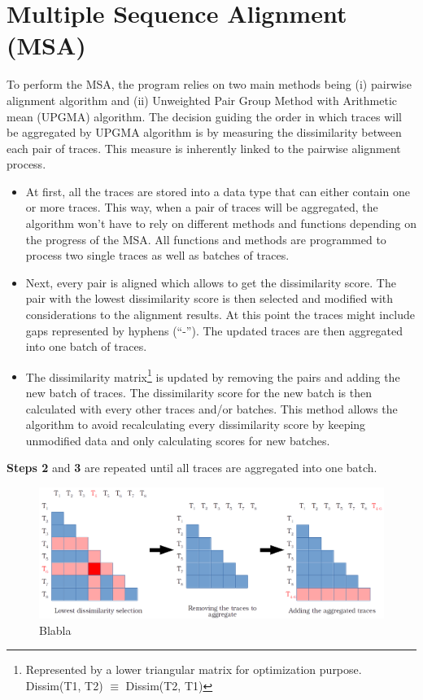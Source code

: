 \documentclass[12pt,a4paper]{article}
\begin{document}
\section{Multiple Sequence Alignment (MSA)}


To perform the MSA, the program relies on two main methods being (i) pairwise alignment algorithm and (ii) Unweighted Pair Group Method with Arithmetic mean (UPGMA) algorithm. The decision guiding the order in which traces will be aggregated by UPGMA algorithm is by measuring the dissimilarity between each pair of traces. This measure is inherently linked to the pairwise alignment process.

\begin{itemize}
\item[\textbf{Step 1}] At first, all the traces are stored into a data type that can either contain one or more traces. This way, when a pair of traces will be aggregated, the algorithm won't have to rely on different methods and functions depending on the progress of the MSA. All functions and methods are programmed to process two single traces as well as batches of traces.

\item[\textbf{Step 2}] Next, every pair is aligned which allows to get the dissimilarity score. The pair with the lowest dissimilarity score is then selected and modified with considerations to the alignment results. At this point the traces might include gaps represented by hyphens (``-''). The updated traces are then aggregated into one batch of traces.

\item[\textbf{Step 3}] The dissimilarity matrix\footnote{Represented by a lower triangular matrix for optimization purpose. Dissim(T1, T2) $\equiv$ Dissim(T2, T1)} is updated by removing the pairs and adding the new batch of traces. The dissimilarity score for the new batch is then calculated with every other traces and/or batches. This method allows the algorithm to avoid recalculating every dissimilarity score by keeping unmodified data and only calculating scores for new batches.
\end{itemize}

\textbf{Steps 2} and \textbf{3} are repeated until all traces are aggregated into one batch.

\begin{figure}[H]
	\centering
	\includegraphics[width=1\linewidth]{img/matrix_aggregation.png}
	\caption{Blabla}
	\label{img:matrix}
\end{figure}
\end{document}
